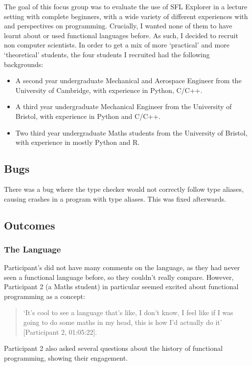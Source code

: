 The goal of this focus group was to evaluate the use of SFL Explorer  in a lecture setting with complete beginners, with a wide variety of different experiences with and perspectives on programming. Crucially, I wanted none of them to have learnt about or used functional languages before. As such, I decided to recruit non computer scientists. In order to get a mix of more `practical' and more `theoretical' students, the four students I recruited had the following backgrounds:

\begin{itemize}
    \item A second year undergraduate Mechanical and Aerospace Engineer from the University of Cambridge, with experience in Python, C/C++.
    \item A third year undergraduate Mechanical Engineer from the University of Bristol, with experience in Python and C/C++.
    \item Two third year undergraduate Maths students from the University of Bristol, with experience in mostly Python and R.
\end{itemize}

\subsection{Bugs}
There was a bug where the type checker would not correctly follow type aliases, causing crashes in a program with type aliases. This was fixed afterwards. 

\subsection{Outcomes}

\subsubsection{The Language}
Participant's did not have many comments on the language, as they had never seen a functional language before, so they couldn't really compare. However, Participant 2 (a Maths student) in particular seemed excited about functional programming as a concept:
\begin{quotation}
\noindent `It's cool to see a language that's like, I don't know, I feel like if I was going to do some maths in my head, this is how I'd actually do it' [Participant 2, 01:05:22]. 
\end{quotation}
\noindent Participant 2 also asked several questions about the history of functional programming, showing their engagement. 

